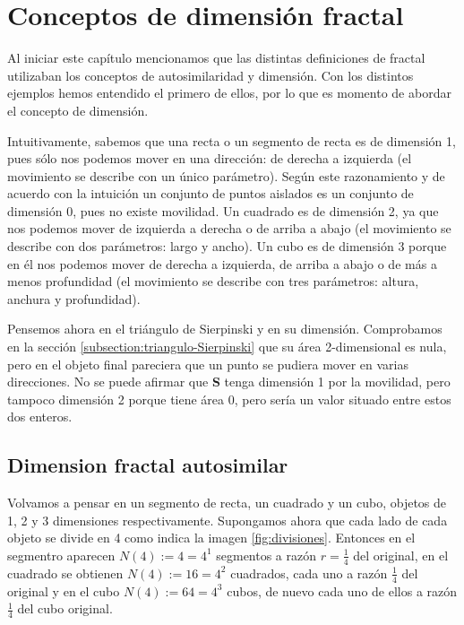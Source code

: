 \section{Conceptos de dimensión fractal}
\label{section:dimension}

Al iniciar este capítulo mencionamos que las distintas definiciones de fractal utilizaban los conceptos de autosimilaridad y dimensión. Con los distintos ejemplos hemos entendido el primero de ellos, por lo que es momento de abordar el concepto de dimensión. 

Intuitivamente, sabemos que una recta o un segmento de recta es de dimensión 1, pues sólo nos podemos mover en una dirección: de derecha a izquierda (el movimiento se describe con un único parámetro). Según este razonamiento y de acuerdo con la intuición un conjunto de puntos aislados es un conjunto de dimensión 0, pues no existe movilidad. Un cuadrado es de dimensión 2, ya que nos podemos mover de izquierda a derecha o de arriba a abajo (el movimiento se describe con dos parámetros: largo y ancho). Un cubo es de dimensión 3 porque en él nos podemos mover de derecha a izquierda, de arriba a abajo o de más a menos profundidad (el movimiento se describe con tres parámetros: altura, anchura y profundidad). 

Pensemos ahora en el triángulo de Sierpinski y en su dimensión. Comprobamos en la sección \ref{subsection:triangulo-Sierpinski} que su área 2-dimensional es nula, pero en el objeto final pareciera que un punto se pudiera mover en varias direcciones. No se puede afirmar que \textbf{S} tenga dimensión 1 por la movilidad, pero tampoco dimensión 2 porque tiene área 0, pero sería un valor situado entre estos dos enteros.

\subsection{Dimension fractal autosimilar}
\label{subsection:dim-frac-autosimilar}

Volvamos a pensar en un segmento de recta, un cuadrado y un cubo, objetos de 1, 2 y 3 dimensiones respectivamente. Supongamos ahora que cada lado de cada objeto se divide en 4 como indica la imagen \ref{fig:divisiones}. Entonces en el segmentro aparecen $N(4):=4=4^1$ segmentos a razón $r=\frac 1 4$ del original, en el cuadrado se obtienen $N(4):=16=4^2$ cuadrados, cada uno a razón $\frac 1 4$ del original y en el cubo $N(4):=64=4^3$ cubos, de nuevo cada uno de ellos a razón $\frac 1 4$ del cubo original.

